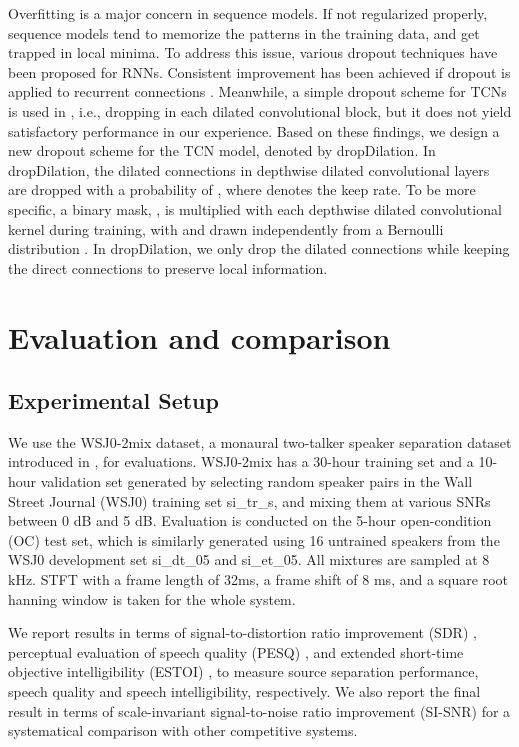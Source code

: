 \documentclass[journal]{IEEEtran}
\begin{document}
Overfitting is a major concern in sequence models.
If not regularized properly, sequence models tend to memorize the patterns in the training data, and get trapped in local minima. 
To address this issue, various dropout techniques \cite{RDO1} \cite{RDO3} \cite{RDO2} have been proposed for RNNs. Consistent improvement has been achieved if dropout is applied to recurrent connections \cite{RDO3}. 
Meanwhile, a simple dropout scheme for TCNs is used in \cite{TCN1}, i.e., dropping  in each dilated convolutional block, but it does not yield satisfactory performance in our experience. 
Based on these findings, we design a new dropout scheme for the TCN model, denoted by dropDilation.
In dropDilation, the dilated connections in depthwise dilated convolutional layers are dropped with a probability of , where  denotes the keep rate.
To be more specific, a binary mask, , 
is multiplied with each depthwise dilated convolutional kernel  during training, with  and  drawn independently from a Bernoulli distribution .
In dropDilation, we only drop the dilated connections while keeping the direct connections to preserve local information.


 
\section{Evaluation and comparison}
\label{sec:5}
\subsection{Experimental Setup}
\label{sec:5.1}
We use the WSJ0-2mix dataset, a monaural two-talker speaker separation dataset introduced in \cite{DC}, for evaluations.
WSJ0-2mix has a 30-hour training set and a 10-hour validation set generated by selecting random speaker pairs in the Wall Street Journal (WSJ0) training set si\_tr\_s, and mixing them at various SNRs between 0 dB and 5 dB.
Evaluation is conducted on the 5-hour open-condition (OC) test set, which is similarly generated using 16 untrained speakers from the WSJ0 development set si\_dt\_05 and si\_et\_05.
All mixtures are sampled at 8 kHz.
STFT with a frame length of 32ms, a frame shift of 8 ms, and a square root hanning window is taken for the whole system. 


We report results in terms of signal-to-distortion ratio improvement (SDR) \cite{SDR}, perceptual evaluation of speech quality (PESQ) \cite{PESQ}, and extended short-time objective intelligibility (ESTOI) \cite{eSTOI}, to measure source separation performance, speech quality and speech intelligibility, respectively.
We also report the final result in terms of scale-invariant signal-to-noise ratio improvement (SI-SNR) \cite{Tasnet} for a systematical comparison with other competitive systems.
\end{document}
